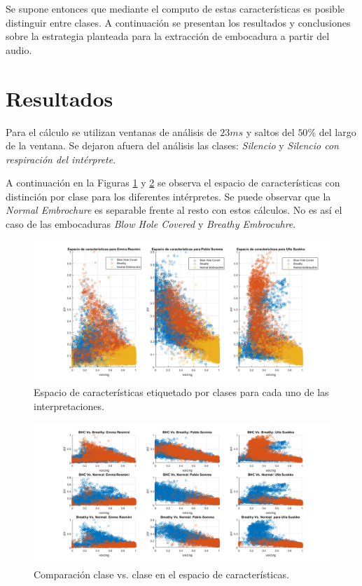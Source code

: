 \documentclass{article}
\begin{document}
Se supone entonces que mediante el computo de estas características es posible distinguir entre clases. A continuación se presentan los resultados y conclusiones sobre la estrategia planteada para la extracción de embocadura a partir del audio.

\newpage

\section*{Resultados}
Para el cálculo se utilizan ventanas de análisis de $23ms$ y saltos del $50\%$ del largo de la ventana. Se dejaron afuera del análisis las clases: \textit{Silencio} y \textit{Silencio con respiración del intérprete}.
\medskip

A continuación en la Figuras \ref{fig:histogramas_artista} y \ref{fig:comparative} se observa el espacio de características con distinción por clase para los diferentes intérpretes. Se puede observar que la \textit{Normal Embrochure} es separable frente al resto con estos cálculos. No es así el caso de las embocaduras \textit{Blow Hole Covered} y \textit{Breathy Embrocuhre}.

\begin{figure}[H]
\begin{center}
\includegraphics[width=1\textwidth]{histograms_artist} 
\caption{Espacio de características etiquetado por clases para cada uno de las interpretaciones.}
\label{fig:histogramas_artista}
\end{center}
\end{figure}

\begin{figure}[H]
\begin{center}
\includegraphics[width=1\textwidth]{comparative} 
\caption{Comparación clase vs. clase en el espacio de características.}
\label{fig:comparative}
\end{center}
\end{figure}
\end{document}
